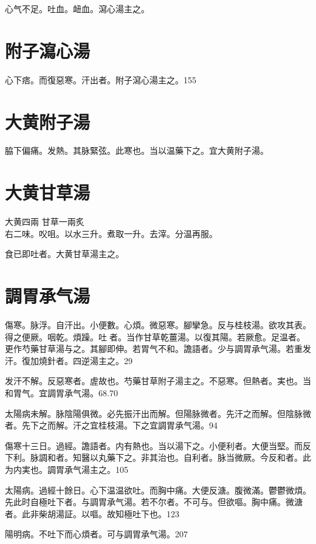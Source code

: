 心气不足。吐血。衄血。瀉心湯主之。

\section{附子瀉心湯}

心下痞。而復惡寒。汗出者。附子瀉心湯主之。155

\section{大黄附子湯}

脇下偏痛。{\khaaitp 发熱。}其脉緊弦。此寒也。{\khaaitp 当}以温藥下之。宜大黄附子湯。

\section{大黄甘草湯}

大黄{\scriptsize 四兩} 甘草{\scriptsize 一兩炙}\\
右二味。㕮咀。以水三升。煮取一升。去滓。分温再服。

食已即吐者。大黄甘草湯主之。

\section{調胃承气湯}

傷寒。脉浮。自汗出。小便數。心煩。微惡寒。腳攣急。反与桂枝湯。欲攻其表。得之便厥。咽乾。煩躁。吐{\sungtpii 𠱘}者。当作甘草乾薑湯。以復其陽。若厥愈。足温者。更作芍藥甘草湯与之。其腳即伸。若胃气不和。譫語者。少与{\khaaitp 調胃}承气湯。若重发汗。復加燒針者。四逆湯主之。29

发汗不解。反惡寒者。虗故也。芍藥甘草附子湯主之。不惡寒。但熱者。実也。当和胃气。宜調胃承气湯。68.70

太陽病未解。脉陰陽俱微。必先振汗出而解。但陽{\khaaitp 脉}微者。先汗之而解。但陰{\khaaitp 脉}微者。先下之而解。汗之宜桂枝湯。下之宜{\khaaitp 調胃}承气湯。94

傷寒十三日。過經。譫語者。内有熱也。当以湯下之。小便利者。大便当堅。而反{\khaaitp 下}利。脉調和者。知醫以丸藥下之。非其治也。自利者。脉当微厥。今反和者。此为内実也。{\khaaitp 調胃}承气湯主之。105

太陽病。過經十餘日。心下温温欲吐。而胸中痛。大便反溏。腹微滿。鬱鬱微煩。先{\khaaitp 此}时自極吐下者。与{\khaaitp 調胃}承气湯。若不尔者。不可与。但欲嘔。胸中痛。微溏者。此非柴胡湯証。以嘔。故知極吐下也。123

陽明病。不吐下而{\khaaitp 心}煩者。可与{\khaaitp 調胃}承气湯。207

